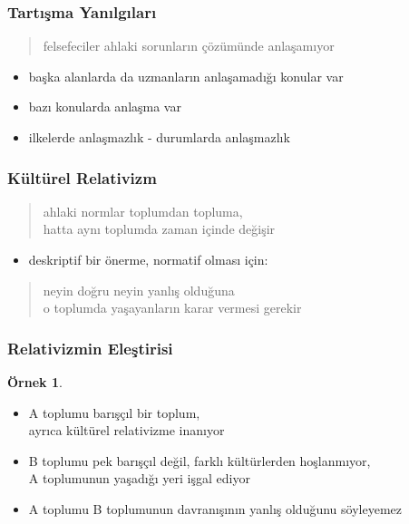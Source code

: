 \documentclass[dvipsnames]{beamer}
\theoremstyle{definition}
\theoremstyle{example}
\newtheorem{ornek}[theorem]{Örnek}
\theoremstyle{plain}
\begin{document}
\begin{frame}
  \frametitle{Tartışma Yanılgıları}

  \begin{quote}
    felsefeciler ahlaki sorunların çözümünde anlaşamıyor
  \end{quote}

  \pause
  \begin{itemize}
    \item başka alanlarda da uzmanların anlaşamadığı konular var

    \pause
    \item bazı konularda anlaşma var

    \pause
    \item ilkelerde anlaşmazlık - durumlarda anlaşmazlık
  \end{itemize}
\end{frame}

\begin{frame}
  \frametitle{Kültürel Relativizm}

  \begin{quote}
    ahlaki normlar toplumdan topluma,\\
    hatta aynı toplumda zaman içinde değişir
  \end{quote}

  \pause
  \begin{itemize}
    \item deskriptif bir önerme, normatif olması için:
  \end{itemize}

  \begin{quote}
    neyin doğru neyin yanlış olduğuna\\
    o toplumda yaşayanların karar vermesi gerekir
  \end{quote}
\end{frame}

\begin{frame}
  \frametitle{Relativizmin Eleştirisi}

  \begin{ornek}
    \begin{itemize}
      \item A toplumu barışçıl bir toplum,\\
        ayrıca kültürel relativizme inanıyor

      \item B toplumu pek barışçıl değil, farklı kültürlerden hoşlanmıyor,\\
        A toplumunun yaşadığı yeri işgal ediyor

      \item A toplumu B toplumunun davranışının yanlış olduğunu
        söyleyemez
    \end{itemize}
  \end{ornek}
\end{frame}
\end{document}
